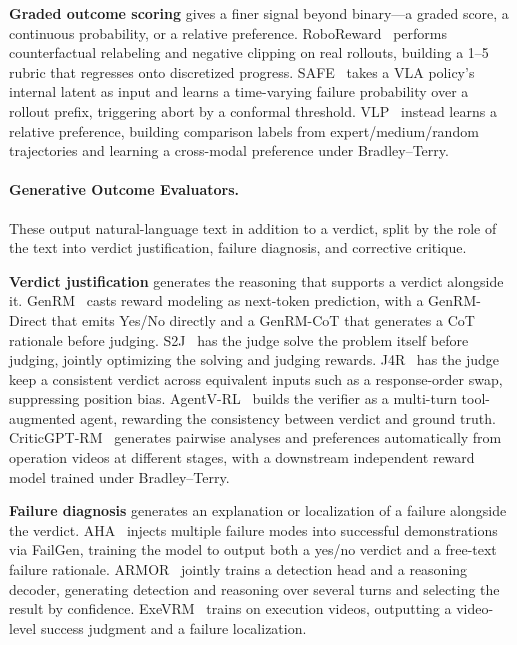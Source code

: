 \textbf{Graded outcome scoring} gives a finer signal beyond binary---a graded score, a continuous probability, or a relative preference. RoboReward~\cite{Lee26b} performs counterfactual relabeling and negative clipping on real rollouts, building a 1--5 rubric that regresses onto discretized progress. SAFE~\cite{Gu25b} takes a VLA policy's internal latent as input and learns a time-varying failure probability over a rollout prefix, triggering abort by a conformal threshold. VLP~\cite{Liu25w} instead learns a relative preference, building comparison labels from expert/medium/random trajectories and learning a cross-modal preference under Bradley--Terry.

\paragraph{Generative Outcome Evaluators.} These output natural-language text in addition to a verdict, split by the role of the text into verdict justification, failure diagnosis, and corrective critique.

\textbf{Verdict justification} generates the reasoning that supports a verdict alongside it. GenRM~\cite{Zha24o} casts reward modeling as next-token prediction, with a GenRM-Direct that emits Yes/No directly and a GenRM-CoT that generates a CoT rationale before judging. S2J~\cite{Sun25l} has the judge solve the problem itself before judging, jointly optimizing the solving and judging rewards. J4R~\cite{Xu25i} has the judge keep a consistent verdict across equivalent inputs such as a response-order swap, suppressing position bias. AgentV-RL~\cite{Zha26ac} builds the verifier as a multi-turn tool-augmented agent, rewarding the consistency between verdict and ground truth. CriticGPT-RM~\cite{Liu24g} generates pairwise analyses and preferences automatically from operation videos at different stages, with a downstream independent reward model trained under Bradley--Terry.

\textbf{Failure diagnosis} generates an explanation or localization of a failure alongside the verdict. AHA~\cite{Dua24} injects multiple failure modes into successful demonstrations via FailGen, training the model to output both a yes/no verdict and a free-text failure rationale. ARMOR~\cite{Qi26} jointly trains a detection head and a reasoning decoder, generating detection and reasoning over several turns and selecting the result by confidence. ExeVRM~\cite{Son26d} trains on execution videos, outputting a video-level success judgment and a failure localization.


